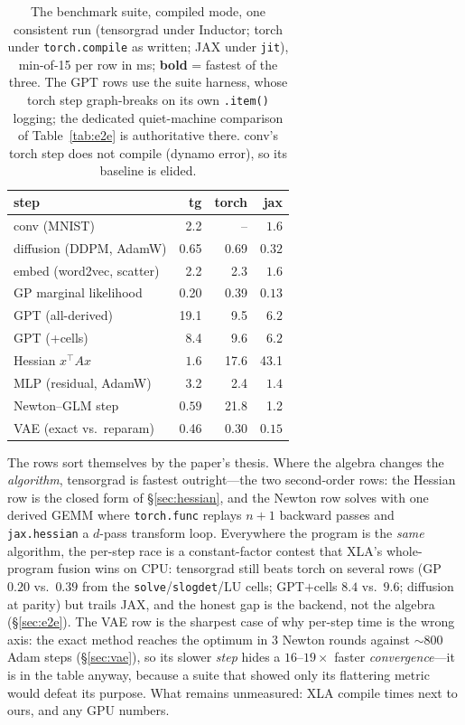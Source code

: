 \documentclass[sigplan,10pt,review]{acmart}
\begin{document}
\begin{table}
\caption{The benchmark suite, compiled mode, one consistent run
(tensorgrad under Inductor; torch under \texttt{torch.compile} as
written; JAX under \texttt{jit}), min-of-15 per row in ms;
\textbf{bold} = fastest of the three. The GPT rows use the suite
harness, whose torch step graph-breaks on its own \texttt{.item()}
logging; the dedicated quiet-machine comparison of
Table~\ref{tab:e2e} is authoritative there. conv's torch step does not
compile (dynamo error), so its baseline is elided.}
\label{tab:suite}
\small
\begin{tabular}{lrrr}
\toprule
step & tg & torch & jax \\
\midrule
conv (MNIST) & 2.2 & -- & $\mathbf{1.6}$ \\
diffusion (DDPM, AdamW) & 0.65 & 0.69 & $\mathbf{0.32}$ \\
embed (word2vec, scatter) & 2.2 & 2.3 & $\mathbf{1.6}$ \\
GP marginal likelihood & 0.20 & 0.39 & $\mathbf{0.13}$ \\
GPT (all-derived) & 19.1 & 9.5 & $\mathbf{6.2}$ \\
GPT (+cells) & 8.4 & 9.6 & $\mathbf{6.2}$ \\
Hessian $x^{\top}Ax$ & $\mathbf{1.6}$ & 17.6 & 43.1 \\
MLP (residual, AdamW) & 3.2 & 2.4 & $\mathbf{1.4}$ \\
Newton--GLM step & $\mathbf{0.59}$ & 21.8 & 1.2 \\
VAE (exact vs.\ reparam) & 0.46 & 0.30 & $\mathbf{0.15}$ \\
\bottomrule
\end{tabular}
\end{table}

The rows sort themselves by the paper's thesis. Where the algebra
changes the \emph{algorithm}, tensorgrad is fastest outright---the two
second-order rows: the Hessian row is the closed form of
\S\ref{sec:hessian}, and the Newton row solves with one derived GEMM
where \texttt{torch.func} replays $n{+}1$ backward passes and
\texttt{jax.hessian} a $d$-pass transform loop. Everywhere the program
is the \emph{same} algorithm, the per-step race is a constant-factor
contest that XLA's whole-program fusion wins on CPU: tensorgrad still
beats torch on several rows (GP $0.20$ vs.\ $0.39$ from the
\texttt{solve}/\texttt{slogdet}/LU cells; GPT$+$cells $8.4$ vs.\ $9.6$;
diffusion at parity) but trails JAX, and the honest gap is the backend,
not the algebra (\S\ref{sec:e2e}). The VAE row is the sharpest case of
why per-step time is the wrong axis: the exact method reaches the
optimum in 3 Newton rounds against ${\sim}800$ Adam steps
(\S\ref{sec:vae}), so its slower \emph{step} hides a $16$--$19\times$
faster \emph{convergence}---it is in the table anyway, because a suite
that showed only its flattering metric would defeat its purpose. What
remains unmeasured: XLA compile times next to ours, and any GPU
numbers.
\end{document}
